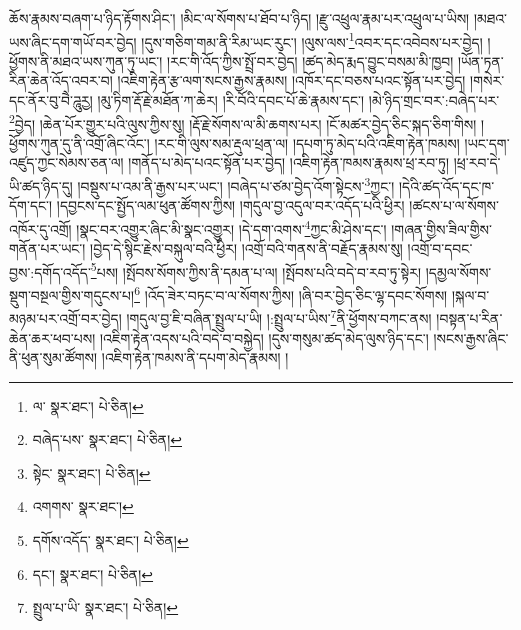 ཆོས་རྣམས་བཞག་པ་ཉིད་རྟོགས་ཤིང་། །མིང་ལ་སོགས་པ་ཐོབ་པ་ཉིད། །རྫུ་འཕྲུལ་རྣམ་པར་འཕྲུལ་པ་ཡིས། །མཐའ་ཡས་ཞིང་དག་གཡོ་བར་བྱེད། །དུས་གཅིག་གམ་ནི་རིམ་ཡང་རུང་། །ལུས་ལས་\footnote{ལ་  སྣར་ཐང་།  པེ་ཅིན། }འབར་དང་འབེབས་པར་བྱེད། །ཕྱོགས་ནི་མཐའ་ཡས་ཀུན་ཏུ་ཡང་། །རང་གི་འོད་ཀྱིས་སྤྲོ་བར་བྱེད། །ཚད་མེད་རྨད་བྱུང་བསམ་མི་ཁྱབ། །ཡོན་ཏན་རིན་ཆེན་འོད་འབར་བ། །འཇིག་རྟེན་རྩ་ལག་སངས་རྒྱས་རྣམས། །འཁོར་དང་བཅས་པའང་སྟོན་པར་བྱེད། །གསེར་དང་ནོར་བུ་བཻ་ཌཱུརྱ། །མུ་ཏིག་རྡོ་རྗེ་མཐོན་ཀ་ཆེར། །རི་བོའི་དབང་པོ་ཆེ་རྣམས་དང་། །མེ་ཉིད་གྲང་བར་:བཞེད་པར་\footnote{བཞེད་པས་  སྣར་ཐང་།  པེ་ཅིན། }བྱེད། །ཆེན་པོར་གྱུར་པའི་ལུས་ཀྱིས་སུ། །རྡོ་རྗེ་སོགས་ལ་མི་ཆགས་པར། །ངོ་མཚར་བྱེད་ཅིང་སྐད་ཅིག་གིས། །ཕྱོགས་ཀུན་དུ་ནི་འགྲོ་ཞིང་འོང་། །རང་གི་ལུས་སམ་རྡུལ་ཕྲན་ལ། །དཔག་ཏུ་མེད་པའི་འཇིག་རྟེན་ཁམས། །ཡང་དག་འཛུད་ཀྱང་སེམས་ཅན་ལ། །གནོད་པ་མེད་པའང་སྟོན་པར་བྱེད། །འཇིག་རྟེན་ཁམས་རྣམས་ཕྲ་རབ་ཏུ། །ཕྲ་རབ་དེ་ཡི་ཚད་ཉིད་དུ། །བསྡུས་པ་འམ་ནི་རྒྱས་པར་ཡང་། །བཞེད་པ་ཙམ་བྱེད་འོག་སྟེངས་\footnote{སྟེང་  སྣར་ཐང་།  པེ་ཅིན། }ཀྱང་། །དེའི་ཚད་འོད་དང་ཁ་དོག་དང་། །དབྱངས་དང་སྤྱོད་ལམ་ཕུན་ཚོགས་ཀྱིས། །གདུལ་བྱ་འདུལ་བར་འདོད་པའི་ཕྱིར། །ཚངས་པ་ལ་སོགས་འཁོར་དུ་འགྲོ། །སྣང་བར་འགྱུར་ཞིང་མི་སྣང་འགྱུར། །དེ་དག་འགས་\footnote{འགགས་  སྣར་ཐང་། }ཀྱང་མི་ཤེས་དང་། །གཞན་གྱིས་ཟིལ་གྱིས་གནོན་པར་ཡང་། །བྱེད་དེ་སྙིང་རྗེས་བསྐུལ་བའི་ཕྱིར། །འགྲོ་བའི་གནས་ནི་བརྗོད་རྣམས་སུ། །འགྲོ་བ་དབང་བྱས་:དགོད་འདོད་\footnote{དགོས་འདོད་  སྣར་ཐང་།  པེ་ཅིན། }པས། །སྤོབས་སོགས་ཀྱིས་ནི་དམན་པ་ལ། །སྤོབས་པའི་བདེ་བ་རབ་ཏུ་སྟེར། །དམྱལ་སོགས་སྡུག་བསྔལ་གྱིས་གདུངས་པ།\footnote{དང་།  སྣར་ཐང་།  པེ་ཅིན། } །འོད་ཟེར་བཏང་བ་ལ་སོགས་ཀྱིས། །ཞི་བར་བྱེད་ཅིང་ལྷ་དབང་སོགས། །སྐལ་བ་མཉམ་པར་འགྲོ་བར་བྱེད། །གདུལ་བྱ་ཇི་བཞིན་སྤྲུལ་པ་ཡི། །:སྤྲུལ་པ་ཡིས་\footnote{སྤྲུལ་པ་ཡི་  སྣར་ཐང་།  པེ་ཅིན། }ནི་ཕྱོགས་བཀང་ནས། །བསྟན་པ་རིན་ཆེན་ཆར་ཕབ་པས། །འཇིག་རྟེན་འདས་པའི་བདེ་བ་བསྐྱེད། །དུས་གསུམ་ཚད་མེད་ལུས་ཉིད་དང་། །སངས་རྒྱས་ཞིང་ནི་ཕུན་སུམ་ཚོགས། །འཇིག་རྟེན་ཁམས་ནི་དཔག་མེད་རྣམས། །
